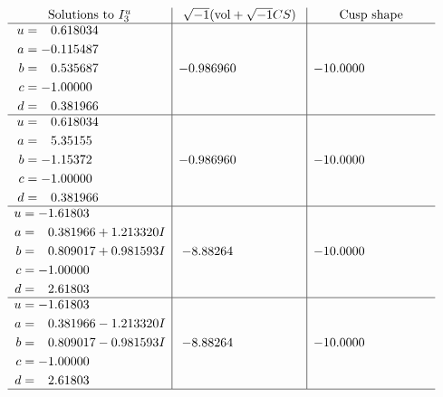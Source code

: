 \documentclass[1p]{elsarticle_modified}
\theoremstyle{definition}
\newcommand{\I}{\sqrt{-1}}
\begin{document}
$$\begin{array}{c|c|c}  
\text{Solutions to }I^u_{3}& \I (\text{vol} + \sqrt{-1}CS) & \text{Cusp shape}\\
 \hline 
\begin{aligned}
u &= \phantom{-}0.618034\phantom{ +0.000000I} \\
a &= -0.115487\phantom{ +0.000000I} \\
b &= \phantom{-}0.535687\phantom{ +0.000000I} \\
c &= -1.00000\phantom{ +0.000000I} \\
d &= \phantom{-}0.381966\phantom{ +0.000000I}\end{aligned}
 & -0.986960\phantom{ +0.000000I} & -10.0000\phantom{ +0.000000I} \\ \hline\begin{aligned}
u &= \phantom{-}0.618034\phantom{ +0.000000I} \\
a &= \phantom{-}5.35155\phantom{ +0.000000I} \\
b &= -1.15372\phantom{ +0.000000I} \\
c &= -1.00000\phantom{ +0.000000I} \\
d &= \phantom{-}0.381966\phantom{ +0.000000I}\end{aligned}
 & -0.986960\phantom{ +0.000000I} & -10.0000\phantom{ +0.000000I} \\ \hline\begin{aligned}
u &= -1.61803\phantom{ +0.000000I} \\
a &= \phantom{-}0.381966 + 1.213320 I \\
b &= \phantom{-}0.809017 + 0.981593 I \\
c &= -1.00000\phantom{ +0.000000I} \\
d &= \phantom{-}2.61803\phantom{ +0.000000I}\end{aligned}
 & -8.88264\phantom{ +0.000000I} & -10.0000\phantom{ +0.000000I} \\ \hline\begin{aligned}
u &= -1.61803\phantom{ +0.000000I} \\
a &= \phantom{-}0.381966 - 1.213320 I \\
b &= \phantom{-}0.809017 - 0.981593 I \\
c &= -1.00000\phantom{ +0.000000I} \\
d &= \phantom{-}2.61803\phantom{ +0.000000I}\end{aligned}
 & -8.88264\phantom{ +0.000000I} & -10.0000\phantom{ +0.000000I}\\
 \hline 
 \end{array}$$\newpage\newpage\renewcommand{\arraystretch}{1}
\end{document}

